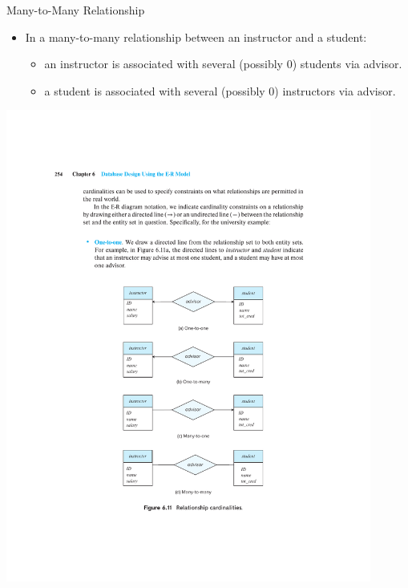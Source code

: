 \documentclass{beamer}
\begin{document}
\begin{frame}{Many-to-Many Relationship}
    \begin{itemize}
        \item In a many-to-many relationship between an instructor and a student:
        \begin{itemize}
            \item an instructor is associated with several (possibly 0) students via advisor.
            \item a student is associated with several (possibly 0) instructors via advisor.
        \end{itemize}
    \end{itemize}
    \centering
    \includegraphics[trim={6cm 5.5cm 6cm 19.75cm}, clip, width=0.9\textwidth]{figures/p254}
\end{frame}
\end{document}
